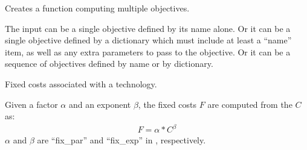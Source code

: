 \documentclass[letterpaper,10pt,english]{sphinxmanual}
\begin{document}

\begin{fulllineitems}
\label{\detokenize{api:muse.objectives.factory}}
Creates a function computing multiple objectives.

The input can be a single objective defined by its name alone. Or it can be a single
objective defined by a dictionary which must include at least a “name” item, as well
as any extra parameters to pass to the objective. Or it can be a sequence of
objectives defined by name or by dictionary.

\end{fulllineitems}


\begin{fulllineitems}
\label{\detokenize{api:muse.objectives.fixed_costs}}
Fixed costs associated with a technology.

Given a factor \(\alpha\) and an  exponent \(\beta\), the fixed costs
\(F\) are computed from the  \(C\) as:
\begin{equation*}
\begin{split}F = \alpha * C^\beta\end{split}
\end{equation*}
\(\alpha\) and \(\beta\) are “fix\_par” and “fix\_exp” in
{\hyperref[\detokenize{inputs/technodata:inputs-technodata}]{}}, respectively.

\end{fulllineitems}
\end{document}
